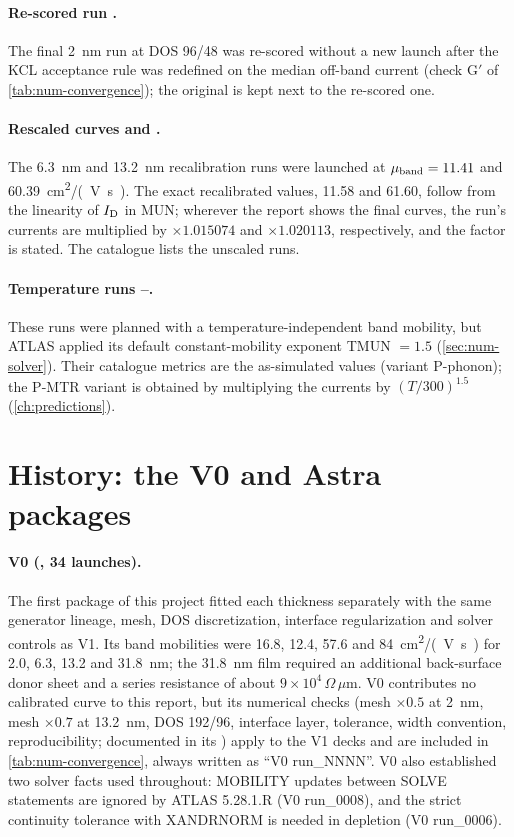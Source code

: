 \paragraph{Re-scored run .} The final \SI{2}{nm} run at DOS 96/48 was re-scored without a new launch after the
KCL acceptance rule was redefined on the median off-band current (check G$'$ of \cref{tab:num-convergence}); the original
 is kept next to the re-scored one.

\paragraph{Rescaled curves  and .} The \SI{6.3}{nm} and \SI{13.2}{nm} recalibration runs were
launched at $\mu_{\mathrm{band}} = 11.41$ and \SI{60.39}{cm^2/(V.s)}. The exact recalibrated values, 11.58 and 61.60, follow from the
linearity of $I_{\mathrm{D}}$ in MUN; wherever the report shows the final curves, the run's currents are multiplied by
$\times 1.015074$ and $\times 1.020113$, respectively, and the factor is stated. The catalogue lists the unscaled runs.

\paragraph{Temperature runs --.} These runs were planned with a temperature-independent band mobility,
but ATLAS applied its default constant-mobility exponent TMUN $= 1.5$ (\cref{sec:num-solver}). Their catalogue metrics are
the as-simulated values (variant P-phonon); the P-MTR variant is obtained by multiplying the currents by $(T/300)^{1.5}$
(\cref{ch:predictions}).

\section{History: the V0 and Astra packages}\label{sec:app-runs-history}

\paragraph{V0 (, 34 launches).} The first package of this project fitted each thickness
separately with the same generator lineage, mesh, DOS discretization, interface regularization and solver controls as V1.
Its band mobilities were 16.8, 12.4, 57.6 and \SI{84}{cm^2/(V.s)} for 2.0, 6.3, 13.2 and \SI{31.8}{nm}; the
\SI{31.8}{nm} film required an additional back-surface donor sheet and a series resistance of about
$9\times10^{4}\,\Omega\,\mu$m. V0 contributes no calibrated curve to this report, but its numerical checks (mesh
$\times 0.5$ at \SI{2}{nm}, mesh $\times 0.7$ at \SI{13.2}{nm}, DOS 192/96, interface layer, tolerance, width
convention, reproducibility; documented in its ) apply to the V1 decks and are
included in \cref{tab:num-convergence}, always written as ``V0 run\_NNNN''. V0 also established two solver facts used
throughout: MOBILITY updates between SOLVE statements are ignored by ATLAS 5.28.1.R (V0 run\_0008), and the strict
continuity tolerance with XANDRNORM is needed in depletion (V0 run\_0006).

